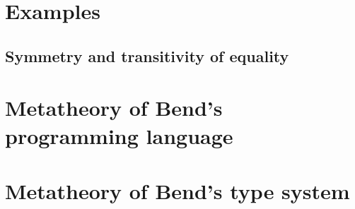 \documentclass{article}
\begin{document}
\section{Examples}



\subsection{Symmetry and transitivity of equality}



\section{Metatheory of Bend's programming language}
\label{sec:opmeta}

\section{Metatheory of Bend's type system}
\label{sec:ttmeta}



\end{document}
